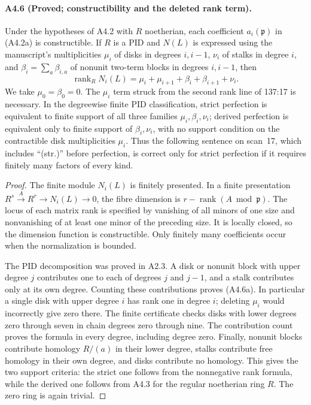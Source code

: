 \paragraph{A4.6 (Proved; constructibility and the deleted rank term).}
\label{A4.6}
Under the hypotheses of A4.2 with $R$ noetherian, each coefficient
$a_i(\mathfrak p)$ in (A4.2a) is constructible.  If $R$ is a PID
and $N(L)$ is expressed using the manuscript's multiplicities
$\mu_i$ of disks in degrees $i,i-1$, $\nu_i$ of stalks in degree
$i$, and $\beta_i=\sum_a\beta_{i,a}$ of nonunit two-term blocks
in degrees $i,i-1$, then
\[
 \operatorname{rank}_R N_i(L)
 =\mu_i+\mu_{i+1}+\beta_i+\beta_{i+1}+\nu_i.
 \tag{A4.6a}
\]
We take $\mu_0=\beta_0=0$.  The $\mu_i$ term struck from the
second rank line of 137:17 is necessary.  In the degreewise finite
PID classification, strict perfection is equivalent to finite
support of all three families $\mu_i,\beta_i,\nu_i$; derived
perfection is equivalent only to finite support of
$\beta_i,\nu_i$, with no support condition on the contractible
disk multiplicities $\mu_i$.  Thus the following sentence on
scan~17, which includes ``(str.)'' before perfection, is correct
only for strict perfection if it requires finitely many factors
of every kind.

\begin{proof}
The finite module $N_i(L)$ is finitely presented.  In a finite
presentation $R^s\xrightarrow{A}R^r\to N_i(L)\to0$, the fibre
dimension is $r-\operatorname{rank}(A\bmod\mathfrak p)$.
The locus of each matrix rank is specified by vanishing of all
minors of one size and nonvanishing of at least one minor of the
preceding size.  It is locally closed, so the dimension function
is constructible.  Only finitely many coefficients occur when
the normalization is bounded.

The PID decomposition was proved in A2.3.  A disk or nonunit
block with upper degree $j$ contributes one to each of degrees
$j$ and $j-1$, and a stalk contributes only at its own degree.
Counting these contributions proves (A4.6a).  In particular a
single disk with upper degree $i$ has rank one in degree $i$;
deleting $\mu_i$ would incorrectly give zero there.  The finite
certificate checks disks with lower degrees zero through seven
in chain degrees zero through nine.  The contribution count
proves the formula in every degree, including degree zero.
Finally, nonunit blocks contribute homology $R/(a)$ in their
lower degree, stalks contribute free homology in their own degree,
and disks contribute no homology.  This gives the two support
criteria: the strict one follows from the nonnegative rank
formula, while the derived one follows from A4.3 for the regular
noetherian ring $R$.  The zero ring is again trivial.
\end{proof}

